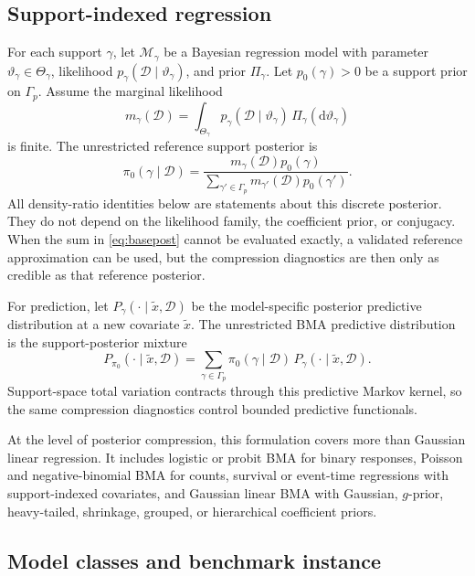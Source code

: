 \documentclass[twoside,11pt]{article}
\newcommand{\D}{\mathcal{D}}
\begin{document}
\subsection{Support-indexed regression}

For each support \(\gamma\), let \(\mathcal M_\gamma\) be a Bayesian regression model with parameter \(\vartheta_\gamma\in\Theta_\gamma\), likelihood \(p_\gamma(\D\mid\vartheta_\gamma)\), and prior \(\Pi_\gamma\). Let \(p_0(\gamma)>0\) be a support prior on \(\Gamma_p\). Assume the marginal likelihood
\begin{equation}
m_\gamma(\D) = \int_{\Theta_\gamma} p_\gamma(\D\mid\vartheta_\gamma)\, \Pi_\gamma(\mathrm d\vartheta_\gamma) \label{eq:generalmarginal}
\end{equation}
is finite. The unrestricted reference support posterior is
\begin{equation}
\pi_0(\gamma\mid\D) = \frac{m_\gamma(\D)p_0(\gamma)} {\sum_{\gamma'\in\Gamma_p}m_{\gamma'}(\D)p_0(\gamma')}. \label{eq:basepost}
\end{equation}
All density-ratio identities below are statements about this discrete posterior. They do not depend on the likelihood family, the coefficient prior, or conjugacy. When the sum in \eqref{eq:basepost} cannot be evaluated exactly, a validated reference approximation can be used, but the compression diagnostics are then only as credible as that reference posterior.

For prediction, let \(P_\gamma(\cdot\mid\tilde x,\D)\) be the model-specific posterior predictive distribution at a new covariate \(\tilde x\). The unrestricted BMA predictive distribution is the support-posterior mixture
\[
P_{\pi_0}(\cdot\mid\tilde x,\D) = \sum_{\gamma\in\Gamma_p} \pi_0(\gamma\mid\D)\, P_\gamma(\cdot\mid\tilde x,\D).
\]
Support-space total variation contracts through this predictive Markov kernel, so the same compression diagnostics control bounded predictive functionals.

At the level of posterior compression, this formulation covers more than Gaussian linear regression. It includes logistic or probit BMA for binary responses, Poisson and negative-binomial BMA for counts, survival or event-time regressions with support-indexed covariates, and Gaussian linear BMA with Gaussian, \(g\)-prior, heavy-tailed, shrinkage, grouped, or hierarchical coefficient priors.

\subsection{Model classes and benchmark instance}
\end{document}
